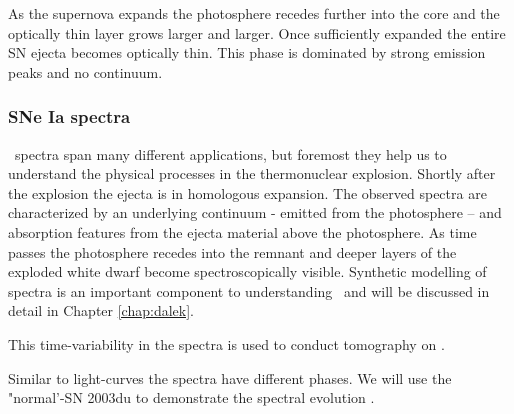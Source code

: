 As the supernova expands the photosphere recedes further into the core and the optically thin layer grows larger and larger. Once sufficiently expanded the entire SN ejecta becomes optically thin. This phase is dominated by strong emission peaks and no continuum. 


\subsubsection{SNe Ia spectra}

\sneia\ spectra span many different applications, but foremost they help us to understand the physical processes in the thermonuclear explosion. 
Shortly after the explosion the ejecta is in homologous expansion.
The observed spectra are characterized by an underlying continuum - emitted from the photosphere -- and absorption features from the ejecta material above the photosphere. 
As time passes the photosphere recedes into the remnant and deeper layers of the exploded white dwarf become spectroscopically visible. Synthetic modelling of spectra is an important component to understanding \sneia\ and will be discussed in detail in Chapter \ref{chap:dalek}.

This time-variability in the spectra is used to conduct tomography on \sneia \citep{2005MNRAS.360.1231S}. 

Similar to light-curves the spectra have different phases. We will use the "normal'-\snia SN 2003du to demonstrate the spectral evolution \citep{2011MNRAS.410.1725T}. 

